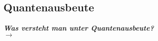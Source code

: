 \subsection{\label{subsec:FZV3}Quantenausbeute}
\textbf{\textit{Was versteht man unter Quantenausbeute?}} \\
$\rightarrow$